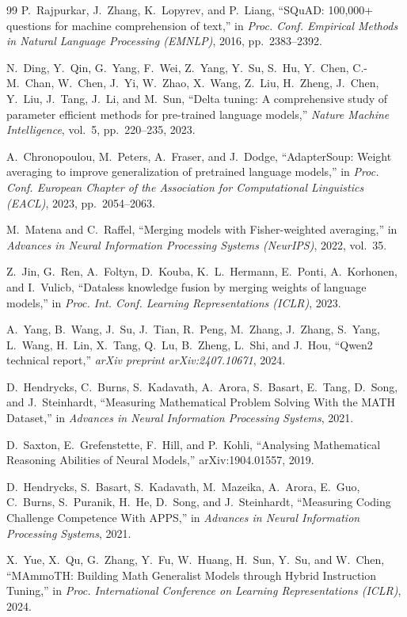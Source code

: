 \documentclass[preprint,12pt]{elsarticle}
\begin{document}
\begin{thebibliography}{99}
P.~Rajpurkar, J.~Zhang, K.~Lopyrev, and P.~Liang,
``SQuAD: 100,000+ questions for machine comprehension of text,'' in
\textit{Proc. Conf. Empirical Methods in Natural Language Processing (EMNLP)},
2016, pp.~2383--2392.

N.~Ding, Y.~Qin, G.~Yang, F.~Wei, Z.~Yang, Y.~Su, S.~Hu, Y.~Chen,
C.-M.~Chan, W.~Chen, J.~Yi, W.~Zhao, X.~Wang, Z.~Liu, H.~Zheng, J.~Chen,
Y.~Liu, J.~Tang, J.~Li, and M.~Sun,
``Delta tuning: A comprehensive study of parameter efficient methods for
pre-trained language models,''
\textit{Nature Machine Intelligence}, vol.~5, pp.~220--235, 2023.

A.~Chronopoulou, M.~Peters, A.~Fraser, and J.~Dodge,
``AdapterSoup: Weight averaging to improve generalization of pretrained
language models,'' in
\textit{Proc. Conf. European Chapter of the Association for Computational
Linguistics (EACL)}, 2023, pp.~2054--2063.

M.~Matena and C.~Raffel,
``Merging models with Fisher-weighted averaging,'' in
\textit{Advances in Neural Information Processing Systems (NeurIPS)}, 2022,
vol.~35.

Z.~Jin, G.~Ren, A.~Foltyn, D.~Kouba, K.~L.~Hermann, E.~Ponti, A.~Korhonen,
and I.~Vulicb,
``Dataless knowledge fusion by merging weights of language models,'' in
\textit{Proc. Int. Conf. Learning Representations (ICLR)}, 2023.

A.~Yang, B.~Wang, J.~Su, J.~Tian, R.~Peng, M.~Zhang, J.~Zhang, S.~Yang,
L.~Wang, H.~Lin, X.~Tang, Q.~Lu, B.~Zheng, L.~Shi, and J.~Hou,
``Qwen2 technical report,''
\textit{arXiv preprint arXiv:2407.10671}, 2024.

D.~Hendrycks, C.~Burns, S.~Kadavath, A.~Arora, S.~Basart, E.~Tang, D.~Song,
and J.~Steinhardt, ``Measuring Mathematical Problem Solving With the MATH
Dataset,'' in \textit{Advances in Neural Information Processing Systems}, 2021.

D.~Saxton, E.~Grefenstette, F.~Hill, and P.~Kohli, ``Analysing Mathematical
Reasoning Abilities of Neural Models,'' arXiv:1904.01557, 2019.

D.~Hendrycks, S.~Basart, S.~Kadavath, M.~Mazeika, A.~Arora, E.~Guo,
C.~Burns, S.~Puranik, H.~He, D.~Song, and J.~Steinhardt, ``Measuring Coding
Challenge Competence With APPS,'' in
\textit{Advances in Neural Information Processing Systems}, 2021.

X.~Yue, X.~Qu, G.~Zhang, Y.~Fu, W.~Huang, H.~Sun, Y.~Su, and W.~Chen,
``MAmmoTH: Building Math Generalist Models through Hybrid Instruction Tuning,''
in \textit{Proc. International Conference on Learning Representations (ICLR)},
2024.

\end{thebibliography}
\end{document}
